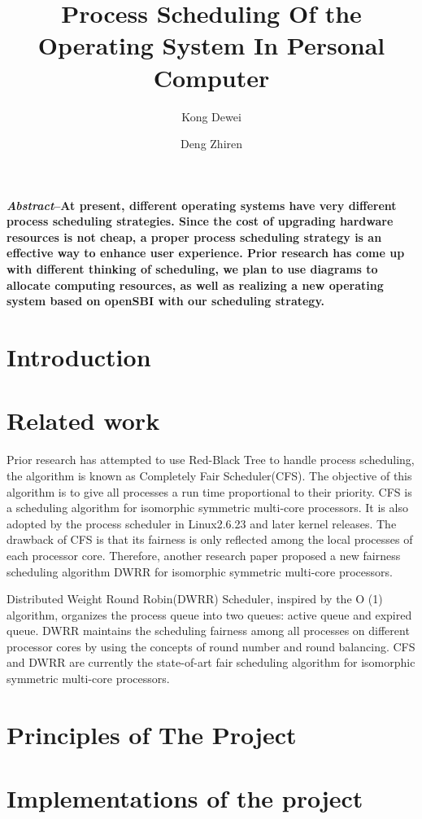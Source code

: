 \documentclass{article}
\title{Process Scheduling Of the Operating System In Personal Computer }
\author{Kong Dewei}
\date{Deng Zhiren}
\begin{document}
\maketitle
\textbf{\emph{Abstract}--At present, different operating systems have very different process scheduling strategies. Since the cost of upgrading hardware resources is not cheap, a proper process scheduling strategy is an effective way to enhance user experience. Prior research has come up with different thinking of scheduling, we plan to use diagrams to allocate computing resources, as well as realizing a new operating system based on openSBI with our scheduling strategy. }
\begin{multicols}{2}       %


\section{Introduction}

\section{Related work}
Prior research has attempted to use Red-Black Tree to handle process scheduling, the algorithm is known as Completely Fair Scheduler(CFS). The objective of this algorithm is to give all processes a run time proportional to their priority. CFS is a scheduling algorithm for isomorphic symmetric multi-core processors. It is also adopted by the process scheduler in Linux2.6.23 and later kernel releases. The drawback of CFS is that its fairness is only reflected among the local processes of each processor core. Therefore, another research paper proposed a new fairness scheduling algorithm DWRR for isomorphic symmetric multi-core processors.

Distributed Weight Round Robin(DWRR) Scheduler, inspired by the O (1) algorithm, organizes the process queue into two queues: active queue and expired queue. DWRR maintains the scheduling fairness among all processes on different processor cores by using the concepts of round number and round balancing. CFS and DWRR are currently the state-of-art fair scheduling algorithm for isomorphic symmetric multi-core processors. 

\section{Principles of The Project}
\section{Implementations of the project}
\end{multicols}
\end{document}
